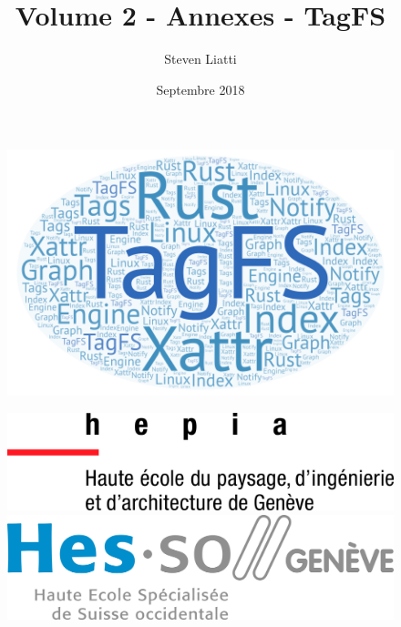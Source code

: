 \documentclass[a4paper, 12pt]{article}
\begin{document}
\title{Volume 2 - Annexes - TagFS}
\author{Steven Liatti}
\date{Septembre 2018}
\maketitle

\begin{figure}
    \begin{center}
        \includegraphics[width=1\textwidth]{images/title.png}
    \end{center}
\end{figure}

\begin{figure}[!b]
	\centering
	\begin{minipage}{.5\textwidth}
		\centering
		\includegraphics[width=.7\linewidth]{images/hepia.jpg}
	\end{minipage}%
	\begin{minipage}{.5\textwidth}
		\centering
		\includegraphics[width=.7\linewidth]{images/hesso.jpg}
	\end{minipage}
\end{figure}
\newpage
\end{document}
